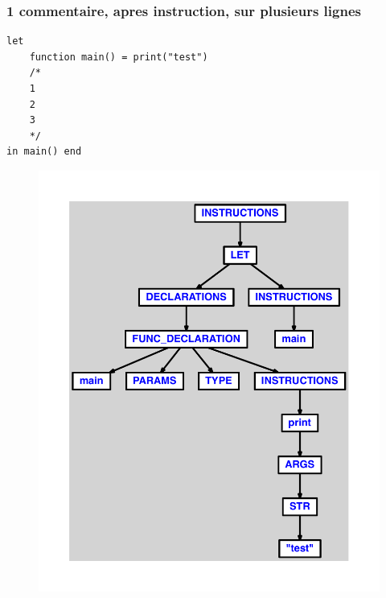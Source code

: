 \documentclass{article}
\begin{document}
\subsubsection{1 commentaire, apres instruction, sur plusieurs lignes}
\begin{lstlisting}
let
	function main() = print("test")
	/*
	1
	2
	3
	*/
in main() end
\end{lstlisting}
\newpage
\begin{figure}[H]
\centering
\includegraphics[max width=\textwidth]{ast/ast_153.pdf}
\end{figure}
\newpage
\end{document}
